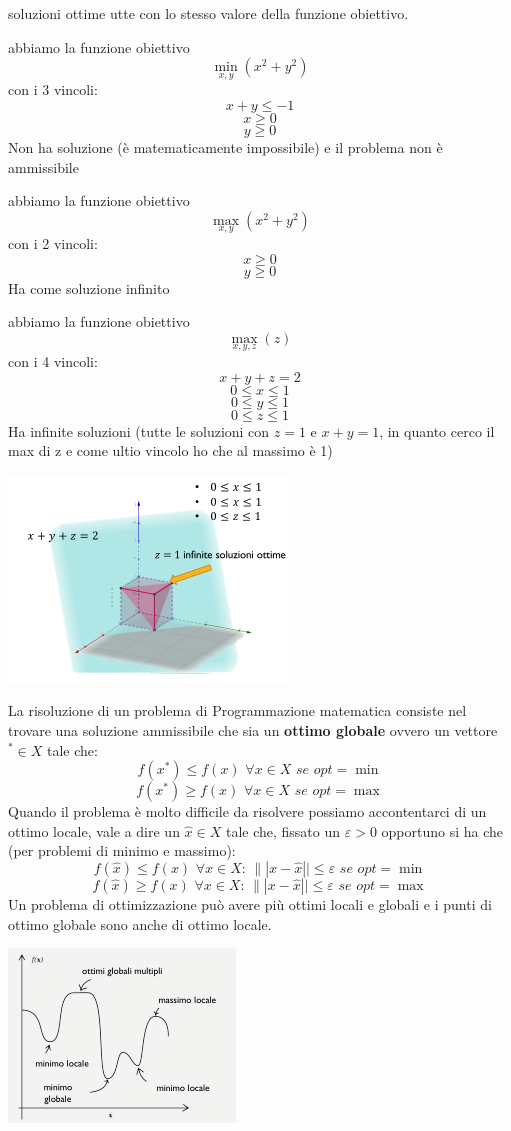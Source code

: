 \documentclass[a4paper,12pt, oneside]{book}
\begin{document}
soluzioni ottime utte con lo stesso valore della funzione
obiettivo.
\begin{esempio}
  abbiamo la funzione obiettivo
  \[\min_{x,y}(x^2+y^2)\]
  con i 3 vincoli:
  \[x+y \leq -1\]
  \[x\geq 0\]
  \[y\geq 0\]
  Non ha soluzione (è matematicamente impossibile) e il problema
  non è ammissibile
\end{esempio}
\begin{esempio}
  abbiamo la funzione obiettivo
  \[\max_{x,y}(x^2+y^2)\]
  con i 2 vincoli:
  \[x\geq 0\]
  \[y\geq 0\]
  Ha come soluzione infinito
\end{esempio}
\begin{esempio}
  abbiamo la funzione obiettivo
  \[\max_{x,y,z}(z)\]
  con i 4 vincoli:
  \[x+y+z = 2\]
  \[0\leq x \leq 1\]
  \[0\leq y \leq 1\]
  \[0\leq z \leq 1\]
  Ha infinite soluzioni (tutte le soluzioni con $z=1$ e $x+y=1$, in quanto cerco
  il max di z e come ultio vincolo ho che al massimo è 1)
  \begin{center}
    \includegraphics[scale = 1]{img/tri2.png}
  \end{center}
\end{esempio}
La risoluzione di un problema di Programmazione matematica consiste
nel trovare una soluzione ammissibile che sia un \textbf{ottimo
  globale} ovvero un vettore $^*\in X$ tale che:
\[f(x^*)\leq f(x)\,\,\forall x\in X\,\,se\,\,opt=\min\]
\[f(x^*)\geq f(x)\,\,\forall x\in X\,\,se\,\,opt=\max\]
Quando il problema è molto difficile da risolvere possiamo
accontentarci di un ottimo locale, vale a dire un $\hat{x}\in X$ tale
che, fissato un $\varepsilon > 0$ opportuno si ha che (per problemi di
minimo e massimo):
\[f(\hat{x})\leq f(x)\,\,\forall x\in X:\,\||x-\hat{x}||\leq
  \varepsilon\,\,se\,\,opt=\min\]
\[f(\hat{x})\geq f(x)\,\,\forall x\in X:\,\||x-\hat{x}||\leq \varepsilon\,\,se\,\,opt=\max\]
Un problema di ottimizzazione può avere più ottimi locali e globali e
i punti di ottimo globale sono anche di ottimo locale.
\begin{center}
  \includegraphics[scale = 1.3]{img/opt.png}
\end{center}
\end{document}
